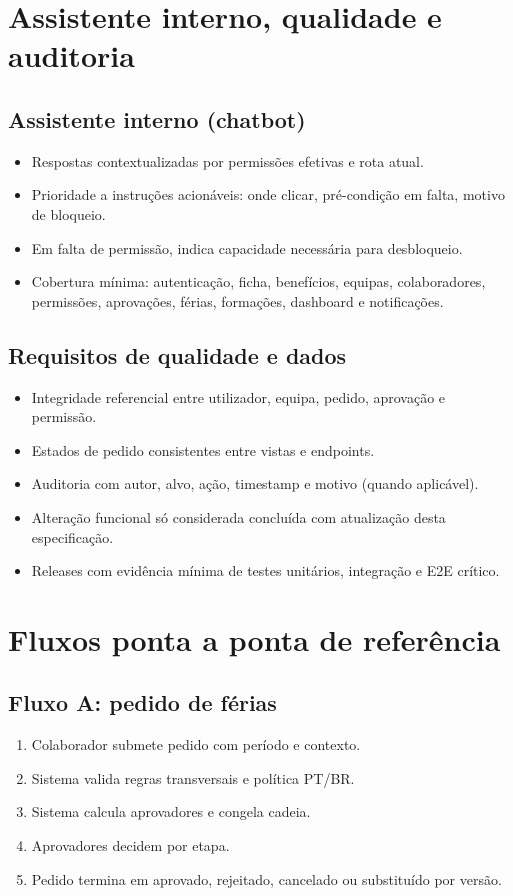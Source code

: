 \documentclass[11pt,a4paper,twoside]{article}
\begin{document}
\section{Assistente interno, qualidade e auditoria}

\subsection{Assistente interno (chatbot)}
\begin{itemize}
  \item Respostas contextualizadas por permissões efetivas e rota atual.
  \item Prioridade a instruções acionáveis: onde clicar, pré-condição em falta, motivo de bloqueio.
  \item Em falta de permissão, indica capacidade necessária para desbloqueio.
  \item Cobertura mínima: autenticação, ficha, benefícios, equipas, colaboradores, permissões, aprovações, férias, formações, dashboard e notificações.
\end{itemize}

\subsection{Requisitos de qualidade e dados}
\begin{itemize}
  \item Integridade referencial entre utilizador, equipa, pedido, aprovação e permissão.
  \item Estados de pedido consistentes entre vistas e endpoints.
  \item Auditoria com autor, alvo, ação, timestamp e motivo (quando aplicável).
  \item Alteração funcional só considerada concluída com atualização desta especificação.
  \item Releases com evidência mínima de testes unitários, integração e E2E crítico.
\end{itemize}

\section{Fluxos ponta a ponta de referência}

\subsection{Fluxo A: pedido de férias}
\begin{enumerate}
  \item Colaborador submete pedido com período e contexto.
  \item Sistema valida regras transversais e política PT/BR.
  \item Sistema calcula aprovadores e congela cadeia.
  \item Aprovadores decidem por etapa.
  \item Pedido termina em aprovado, rejeitado, cancelado ou substituído por versão.
\end{enumerate}
\end{document}
